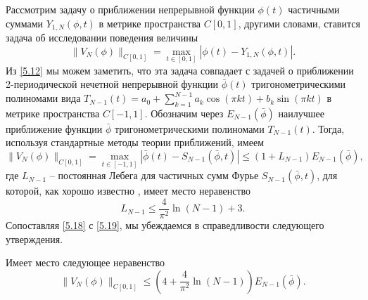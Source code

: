 Рассмотрим  задачу о приближении  непрерывной функции $\phi(t)$ частичными суммами $Y_{1,N}(\phi,t)$ в метрике пространства $C[0,1]$, другими словами, ставится задача об исследовании поведения величины
\begin{equation}\label{5.17}
\|V_N(\phi)\|_{C[0,1]}=\max_{t\in[0,1]}|\phi(t)-Y_{1,N}(\phi,t)|.
\end{equation}
Из \eqref{5.12} мы можем заметить, что эта задача совпадает с задачей о приближении 2-периодической нечетной непрерывной функции $\bar \phi(t)$ тригонометрическими полиномами вида $T_{N-1}(t)=a_0+\sum_{k=1}^{N-1}a_k\cos(\pi kt)+b_k\sin(\pi kt)$ в метрике пространства  $C[-1,1]$. Обозначим через $E_{N-1}(\bar\phi)$ наилучшее приближение функции $\bar\phi$ тригонометрическими полиномами $T_{N-1}(t)$. Тогда, используя стандартные методы теории приближений,  имеем
\begin{equation}\label{5.18}
\|V_N(\phi)\|_{C[0,1]}=\max_{t\in[-1,1]}|\bar\phi(t)-S_{N-1}(\bar\phi,t)|\le (1+L_{N-1})E_{N-1}(\bar\phi),
\end{equation}
где $L_{N-1}$ -- постоянная Лебега для частичных сумм Фурье $S_{N-1}(\bar\phi,t)$, для которой, как хорошо известно \cite{Dzjadyc}, имеет место неравенство
\begin{equation}\label{5.19}
L_{N-1}\le \frac{4}{\pi^2}\ln(N-1)+3.
\end{equation}
Сопоставляя \eqref{5.18} с  \eqref{5.19}, мы убеждаемся в справедливости следующего утверждения.
\begin{corollary}\label{cor2} Имеет место следующее неравенство
	\begin{equation}\label{5.20}
	\|V_N(\phi)\|_{C[0,1]}\le \left(4+\frac{4}{\pi^2}\ln(N-1)\right)E_{N-1}(\bar\phi).
	\end{equation}
\end{corollary}

